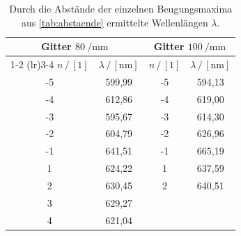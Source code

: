 \begin{table}[H]   
  \centering
  \caption{Durch die Abstände der einzelnen Beugungsmaxima aus \autoref{tab:abstaende} ermittelte Wellenlängen $\lambda$.}
  \begin{tabular}{cc cc}
  \toprule
  \multicolumn{2}{c}{Gitter $\qty{80}{\per\milli\meter}$} &
  \multicolumn{2}{c}{Gitter $\qty{100}{\per\milli\meter}$} \\
  \cmidrule(lr){1-2} \cmidrule(lr){3-4}
  $n \,/\, [1]$&
  $\lambda \,/\, [\unit{\nano\meter}]$ &
  $n \,/\, [1]$&
  $\lambda \,/\, [\unit{\nano\meter}]$ \\
  \midrule
  -5  &  599,99 & -5 & 594,13 \\  
  -4  &  612,86 & -4 & 619,00 \\
  -3  &  595,67 & -3 & 614,30 \\
  -2  &  604,79 & -2 & 626,96 \\
  -1  &  641,51 & -1 & 665,19 \\
  1  &  624,22  & 1  & 637,59 \\
  2  &  630,45  & 2  & 640,51 \\
  3  &  629,27 & {} & {} \\
  4  &  621,04 & {} & {} \\
  \bottomrule
  \end{tabular}
  \label{tab:wellenlaenge}
\end{table}
